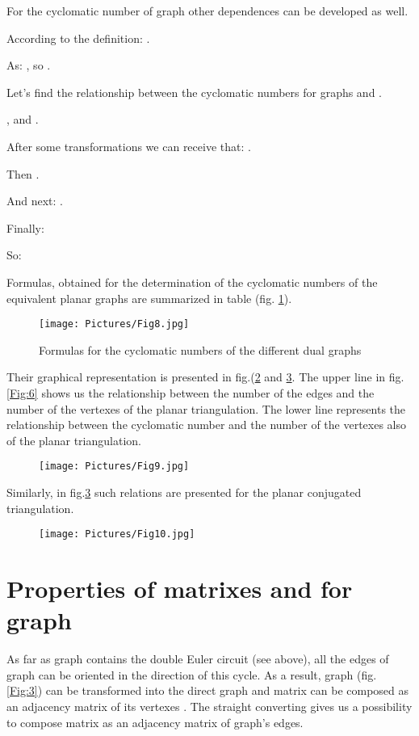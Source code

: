 \documentclass{amsart}
\theoremstyle{plain}
\numberwithin{equation}{section}
\begin{document}
For the cyclomatic number  of graph  other dependences can be developed as well.

According to the definition: . 

As: , so .

Let's find the relationship between the cyclomatic numbers for graphs  and .

, and .
 
After some transformations we can receive that: .

Then . 

And next: 
.

Finally: 
 

So: 


Formulas, obtained for the determination of the cyclomatic numbers of the equivalent planar graphs are summarized in table (fig. \ref{Fig:8}). 

\begin{figure}[htb]
	\texttt{[image: Pictures/Fig8.jpg]}
  \caption{Formulas for the cyclomatic numbers of the different dual graphs}
	\label{Fig:8}
\end{figure}

Their graphical representation is presented in fig.(\ref{Fig:9} and \ref{Fig:10}. The upper line in fig.\ref{Fig:6} shows us the relationship between the number of the edges and the number of the vertexes of the planar triangulation. The lower line represents the relationship between the cyclomatic number and the number of the vertexes also of the planar triangulation. 

\begin{figure}[htb]
		\texttt{[image: Pictures/Fig9.jpg]}
	\caption{}
	\label{Fig:9}
\end{figure}

Similarly, in fig.\ref{Fig:10} such relations are presented for the planar conjugated triangulation. 


\begin{figure}[h]
		\texttt{[image: Pictures/Fig10.jpg]}
	\caption{}
	\label{Fig:10}
\end{figure}

\section{Properties of matrixes  and  for graph }

As far as graph  contains the double Euler circuit (see above), all the edges of graph  can be oriented in the direction of this cycle. As a result, graph  (fig. \ref{Fig:3}) can be transformed into the direct graph and matrix  can be composed as an adjacency matrix of its vertexes \cite {Malinin}. The straight converting gives us a possibility to compose  matrix as an adjacency matrix of graph's  edges.
\end{document}
